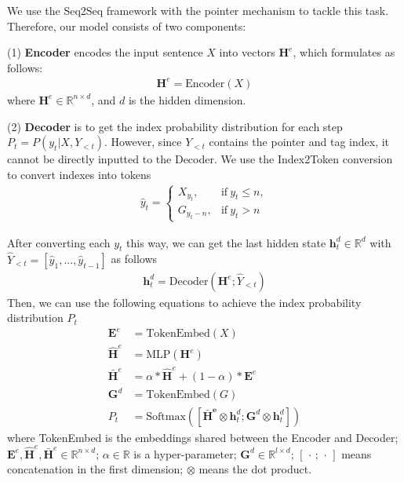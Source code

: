 \documentclass[11pt,a4paper]{article}
\begin{document}
We use the Seq2Seq framework with the pointer mechanism to tackle this task. Therefore, our model consists of two components:

(1) \textbf{Encoder} encodes the input sentence $X$ into vectors $\mathbf{H}^e$, which formulates as follows:
\begin{align}
  \mathbf{H}^e = \mathrm{Encoder}(X)
\end{align}
where $\mathbf{H}^e \in \mathbb{R}^{n \times d}$, and $d$ is the hidden dimension.

(2) \textbf{Decoder} is to get the index probability distribution for each step $P_t = P(y_t|X, Y_{<t})$. However, since $Y_{<t}$ contains the pointer and tag index, it cannot be directly inputted to the Decoder. We use the Index2Token conversion to convert indexes into tokens
\begin{align}
 \hat{y}_t = \begin{cases}
    X_{y_t},&  \text{if}  \  y_t \le n,\\
    G_{y_t-n},&  \text{if} \  y_t > n
  \end{cases}
\end{align}

After converting each $y_t$ this way, we can get the last hidden state $\mathbf{h}_t^d \in \mathbb{R}^d$ with $\hat{Y}_{<t}=[\hat{y}_1, ..., \hat{y}_{t-1}]$ as follows
\begin{align}
  \mathbf{h}_t^d = \mathrm{Decoder}(\mathbf{H}^e; \hat{Y}_{<t})
\end{align}
Then, we can use the following equations to achieve the index probability distribution $P_t$
\begin{align}
  \mathbf{E}^e & = \mathrm{TokenEmbed}(X)\\
  \mathbf{\hat{H}}^e & = \mathrm{MLP}(\mathbf{H}^e) \\
  \mathbf{\bar{H}}^e & = \alpha*\mathbf{\hat{H}}^e + (1-\alpha)*\mathbf{E}^e \\
  \mathbf{G}^d & = \mathrm{TokenEmbed}(G) \\
  P_t & = \mathrm{Softmax}([\mathbf{\bar{H}^e}\otimes \mathbf{h}_t^d;\mathbf{G}^d\otimes \mathbf{h}_t^d] )
\end{align}
where TokenEmbed is the embeddings shared between the Encoder and Decoder; $\mathbf{E}^e,\mathbf{\hat{H}}^e,\mathbf{\bar{H}}^e \in \mathbb{R}^{n \times d}$; $\alpha \in \mathbb{R}$ is a hyper-parameter; $\mathbf{G}^d \in \mathbb{R}^{l \times d}$; $[\, \cdot \, ; \, \cdot \, ]$ means concatenation in the first dimension; $\otimes$ means the dot product.
\end{document}
